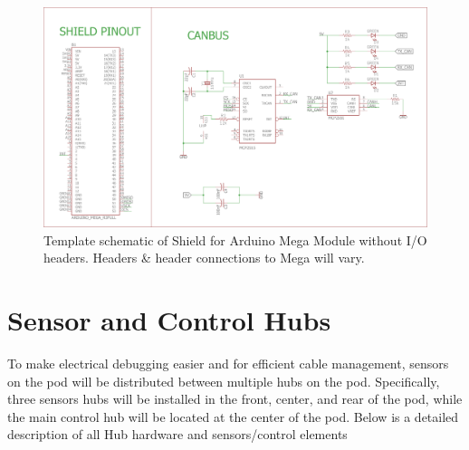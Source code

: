 \documentclass[main.tex]{subfiles}
\begin{document}
  \begin{figure}
        \centering
        \includegraphics[width=\textwidth]{images/MEGA_SHIELD.png}
        \caption{Template schematic of Shield for Arduino Mega Module without I/O headers. Headers \& header connections to Mega will vary.}
        \label{fig:CAN Sheild}
    \end{figure}
    
    

\section{Sensor and Control Hubs}
\label{sec:sensor-and-control-hubs}
To make electrical debugging  easier and for efficient cable management, sensors on the pod will be distributed between multiple hubs on the pod. Specifically, three sensors hubs will be installed in the front, center, and rear of the pod, while the main control hub will be located at the center of the pod. Below is a detailed description of all Hub hardware and sensors/control elements
\end{document}
